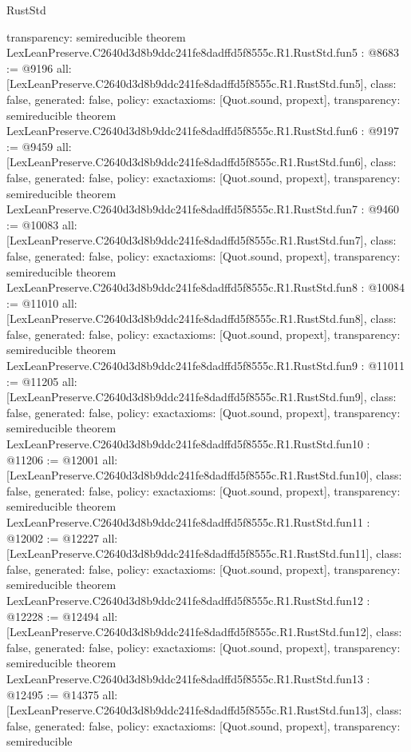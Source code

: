 \begin{lexlean}{RustStd}
\begin{coremodule}
{  transparency: semireducible
}
theorem LexLeanPreserve.C2640d3d8b9ddc241fe8dadffd5f8555c.R1.RustStd.fun5 : @8683 := @9196 {
  all: [LexLeanPreserve.C2640d3d8b9ddc241fe8dadffd5f8555c.R1.RustStd.fun5],
  class: false,
  generated: false,
  policy: exact{axioms: [Quot.sound, propext]},
  transparency: semireducible
}
theorem LexLeanPreserve.C2640d3d8b9ddc241fe8dadffd5f8555c.R1.RustStd.fun6 : @9197 := @9459 {
  all: [LexLeanPreserve.C2640d3d8b9ddc241fe8dadffd5f8555c.R1.RustStd.fun6],
  class: false,
  generated: false,
  policy: exact{axioms: [Quot.sound, propext]},
  transparency: semireducible
}
theorem LexLeanPreserve.C2640d3d8b9ddc241fe8dadffd5f8555c.R1.RustStd.fun7 : @9460 := @10083 {
  all: [LexLeanPreserve.C2640d3d8b9ddc241fe8dadffd5f8555c.R1.RustStd.fun7],
  class: false,
  generated: false,
  policy: exact{axioms: [Quot.sound, propext]},
  transparency: semireducible
}
theorem LexLeanPreserve.C2640d3d8b9ddc241fe8dadffd5f8555c.R1.RustStd.fun8 : @10084 := @11010 {
  all: [LexLeanPreserve.C2640d3d8b9ddc241fe8dadffd5f8555c.R1.RustStd.fun8],
  class: false,
  generated: false,
  policy: exact{axioms: [Quot.sound, propext]},
  transparency: semireducible
}
theorem LexLeanPreserve.C2640d3d8b9ddc241fe8dadffd5f8555c.R1.RustStd.fun9 : @11011 := @11205 {
  all: [LexLeanPreserve.C2640d3d8b9ddc241fe8dadffd5f8555c.R1.RustStd.fun9],
  class: false,
  generated: false,
  policy: exact{axioms: [Quot.sound, propext]},
  transparency: semireducible
}
theorem LexLeanPreserve.C2640d3d8b9ddc241fe8dadffd5f8555c.R1.RustStd.fun10 : @11206 := @12001 {
  all: [LexLeanPreserve.C2640d3d8b9ddc241fe8dadffd5f8555c.R1.RustStd.fun10],
  class: false,
  generated: false,
  policy: exact{axioms: [Quot.sound, propext]},
  transparency: semireducible
}
theorem LexLeanPreserve.C2640d3d8b9ddc241fe8dadffd5f8555c.R1.RustStd.fun11 : @12002 := @12227 {
  all: [LexLeanPreserve.C2640d3d8b9ddc241fe8dadffd5f8555c.R1.RustStd.fun11],
  class: false,
  generated: false,
  policy: exact{axioms: [Quot.sound, propext]},
  transparency: semireducible
}
theorem LexLeanPreserve.C2640d3d8b9ddc241fe8dadffd5f8555c.R1.RustStd.fun12 : @12228 := @12494 {
  all: [LexLeanPreserve.C2640d3d8b9ddc241fe8dadffd5f8555c.R1.RustStd.fun12],
  class: false,
  generated: false,
  policy: exact{axioms: [Quot.sound, propext]},
  transparency: semireducible
}
theorem LexLeanPreserve.C2640d3d8b9ddc241fe8dadffd5f8555c.R1.RustStd.fun13 : @12495 := @14375 {
  all: [LexLeanPreserve.C2640d3d8b9ddc241fe8dadffd5f8555c.R1.RustStd.fun13],
  class: false,
  generated: false,
  policy: exact{axioms: [Quot.sound, propext]},
  transparency: semireducible
}
\end{coremodule}
\end{lexlean}
